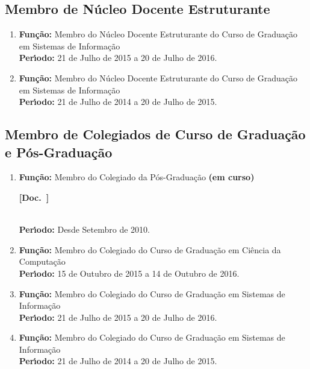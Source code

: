\documentclass[a4paper,oneside,10pt]{article}
\newcounter{document}%
\newcommand\Doc{{\addtocounter{document}{1}\mbox{\sffamily\bfseries [Doc. \arabic{document}]}}}
\begin{document}
\subsection{Membro de Núcleo Docente Estruturante}
\vspace{0.3cm}

\begin{enumerate}
\renewcommand{\labelenumi}{{\large\bfseries\arabic{enumi}.}}

\item   \textbf{Fun\c{c}\~{a}o:} Membro do Núcleo Docente Estruturante do Curso de Graduação em Sistemas de Informação \\
        \textbf{Per\'{\i}odo:} 21 de Julho de 2015 a 20 de Julho de 2016.

\item   \textbf{Fun\c{c}\~{a}o:} Membro do Núcleo Docente Estruturante do Curso de Graduação em Sistemas de Informação \\
        \textbf{Per\'{\i}odo:} 21 de Julho de 2014 a 20 de Julho de 2015.

\end{enumerate}


\subsection{Membro de Colegiados de Curso de Gradua\c{c}\~{a}o e P\'{o}s-Gradua\c{c}\~{a}o}
\vspace{0.3cm}

\begin{enumerate}
\renewcommand{\labelenumi}{{\large\bfseries\arabic{enumi}.}}

\item   \textbf{Fun\c{c}\~{a}o:} Membro do Colegiado da P\'{o}s-Gradua\c{c}\~{a}o \textbf{(em curso)}  \Doc \\
        \textbf{Per\'{\i}odo:} Desde Setembro de 2010.

\item   \textbf{Fun\c{c}\~{a}o:} Membro do Colegiado do Curso de Graduação em Ciência da Computação  \\
        \textbf{Per\'{\i}odo:} 15 de Outubro de 2015 a 14 de Outubro de 2016.

\item   \textbf{Fun\c{c}\~{a}o:} Membro do Colegiado do Curso de Graduação em Sistemas de Informação  \\
        \textbf{Per\'{\i}odo:} 21 de Julho de 2015 a 20 de Julho de 2016.

\item   \textbf{Fun\c{c}\~{a}o:} Membro do Colegiado do Curso de Graduação em Sistemas de Informação  \\
        \textbf{Per\'{\i}odo:} 21 de Julho de 2014 a 20 de Julho de 2015.

\end{enumerate}
\end{document}
